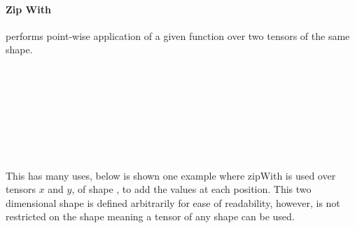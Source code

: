 \paragraph{Zip With}\label{para:zipWith} performs point-wise application of a 
given function  over two tensors of the same shape. 
\begin{code}[hide]%
\>[0]\AgdaSpace{}%
\AgdaSpace{}%
\<%
\\
\>[0][@{}l@{\AgdaIndent{0}}]%
\>[2]\AgdaSpace{}%
\AgdaSpace{}%
\AgdaSpace{}%
\AgdaSpace{}%
\AgdaSymbol{(}\AgdaSymbol{;}\AgdaSpace{}%
\AgdaSymbol{;}\AgdaSpace{}%
\AgdaSymbol{;}\AgdaSpace{}%
\AgdaSymbol{)}\<%
\\
%
\>[2]\<%
\\
\>[2][@{}l@{\AgdaIndent{0}}]%
\>[4]\<%
\\
\>[4][@{}l@{\AgdaIndent{0}}]%
\>[6]\AgdaSpace{}%
\AgdaSpace{}%
\AgdaSpace{}%
\AgdaSymbol{:}\AgdaSpace{}%
\<%
\\
%
\>[6]\AgdaSpace{}%
\AgdaSpace{}%
\AgdaSymbol{:}\AgdaSpace{}%
\<%
\end{code}
\begin{code}%
%
\>[2]\AgdaSpace{}%
\AgdaSymbol{:}\AgdaSpace{}%
\AgdaSymbol{(}\AgdaSpace{}%
\AgdaSpace{}%
\AgdaSpace{}%
\AgdaSpace{}%
\AgdaSymbol{)}\AgdaSpace{}%
\AgdaSpace{}%
\AgdaSpace{}%
\AgdaSpace{}%
\AgdaSpace{}%
\AgdaSpace{}%
\AgdaSpace{}%
\AgdaSpace{}%
\AgdaSpace{}%
\AgdaSpace{}%
\AgdaSpace{}%
\AgdaSpace{}%
\<%
\\
%
\>[2]\AgdaSpace{}%
\AgdaSpace{}%
\AgdaSpace{}%
\AgdaSpace{}%
\AgdaSpace{}%
\AgdaSymbol{=}\AgdaSpace{}%
\AgdaSpace{}%
\AgdaSymbol{(}\AgdaSpace{}%
\AgdaSymbol{)}\AgdaSpace{}%
\AgdaSymbol{(}\AgdaSpace{}%
\AgdaSymbol{)}\<%
\end{code}
This has many uses, below is shown one example where zipWith is used
over tensors $x$ and $y$, of shape ,
to add the values at each position.
This two dimensional shape is defined arbitrarily for ease of readability, 
however,  is not restricted on the shape meaning a tensor of any shape can
be used.

